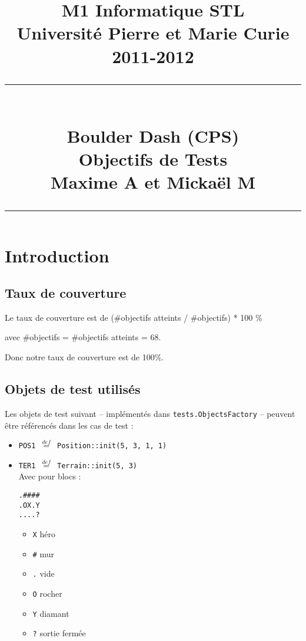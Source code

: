 \documentclass{article}
\title{
	\normalsize{M1 Informatique STL\\
	Université Pierre et Marie Curie\\
	2011-2012}\\
	\vspace{15mm}
	\rule{\linewidth{}}{0.3mm}\\
	\Huge{Boulder Dash (CPS)}\\
	\large{Objectifs de Tests}\\
	\vspace{5mm}
	\footnotesize{Maxime A\bsc{ncelin} et Mickaël M\bsc{enu}}
	\rule{\linewidth{}}{0.3mm}
}
\author{}
\newcommand{\cmd}[1]{\texttt{#1}}
\newcommand{\eqdef}{$\overset{def}{=}$}
\begin{document}
\maketitle{}
\tableofcontents{}
\thispagestyle{empty}

\clearpage{}

\section{Introduction}

\subsection{Taux de couverture}

Le taux de couverture est de (\#objectifs atteints / \#objectifs) * 100 \%

avec \#objectifs = \#objectifs atteints = 68.

Donc notre taux de couverture est de 100\%.

\subsection{Objets de test utilisés}

Les objets de test suivant -- implémentés dans \cmd{tests.ObjectsFactory} -- peuvent être référencés dans les cas de test :

\begin{itemize}
	\item \cmd{POS1 \eqdef{} Position::init(5, 3, 1, 1)}
	\item \cmd{TER1 \eqdef{} Terrain::init(5, 3)}\\

Avec pour blocs :

\begin{verbatim}
.####
.OX.Y
....?

\end{verbatim}

\begin{itemize}
	\item \cmd{X} héro
	\item \cmd{\#} mur
	\item \cmd{.} vide
	\item \cmd{O} rocher
	\item \cmd{Y} diamant
	\item \cmd{?} sortie fermée
\end{itemize}
\end{itemize}
\end{document}
